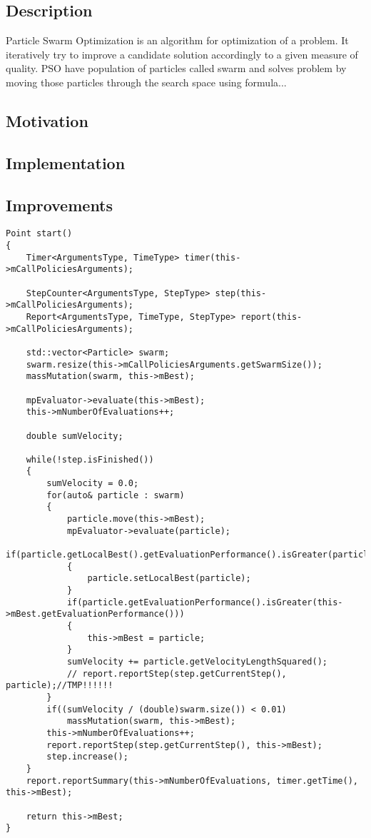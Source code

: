 \subsection{Description}
Particle Swarm Optimization is an algorithm for optimization of a problem. It iteratively try to improve a candidate solution 
accordingly to a given measure of quality. PSO have population of particles called swarm and solves problem by moving those particles 
through the search space using formula...

\subsection{Motivation}

\subsection{Implementation}

\subsection{Improvements}







\begin{lstlisting}
Point start()
{
    Timer<ArgumentsType, TimeType> timer(this->mCallPoliciesArguments);

    StepCounter<ArgumentsType, StepType> step(this->mCallPoliciesArguments);
    Report<ArgumentsType, TimeType, StepType> report(this->mCallPoliciesArguments);

    std::vector<Particle> swarm;
    swarm.resize(this->mCallPoliciesArguments.getSwarmSize());
    massMutation(swarm, this->mBest);

    mpEvaluator->evaluate(this->mBest);
    this->mNumberOfEvaluations++;

    double sumVelocity;

    while(!step.isFinished())
    {
        sumVelocity = 0.0;
        for(auto& particle : swarm)
        {
            particle.move(this->mBest);
            mpEvaluator->evaluate(particle);
            if(particle.getLocalBest().getEvaluationPerformance().isGreater(particle.getEvaluationPerformance()))
            {
                particle.setLocalBest(particle);
            }
            if(particle.getEvaluationPerformance().isGreater(this->mBest.getEvaluationPerformance()))
            {
                this->mBest = particle;
            }
            sumVelocity += particle.getVelocityLengthSquared();
            // report.reportStep(step.getCurrentStep(), particle);//TMP!!!!!!
        }
        if((sumVelocity / (double)swarm.size()) < 0.01)
            massMutation(swarm, this->mBest);
        this->mNumberOfEvaluations++;
        report.reportStep(step.getCurrentStep(), this->mBest);
        step.increase();
    }
    report.reportSummary(this->mNumberOfEvaluations, timer.getTime(), this->mBest);

    return this->mBest;
}
\end{lstlisting}


